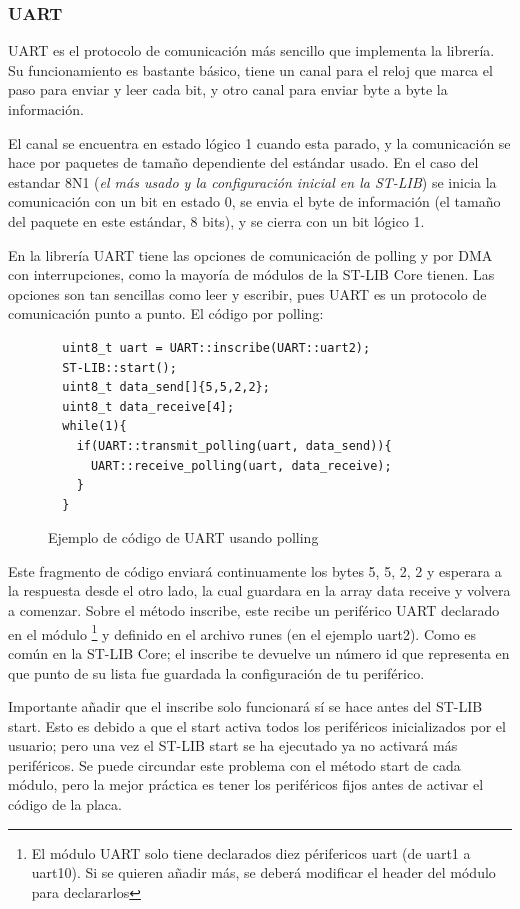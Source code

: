 \documentclass{report}
\begin{document}
\subsubsection{UART}
UART es el protocolo de comunicación más sencillo que implementa la librería. Su funcionamiento es bastante básico, tiene un canal para el reloj que marca el paso para enviar y leer cada bit, y otro canal para enviar byte a byte la información. 
\par
El canal se encuentra en estado lógico 1 cuando esta parado, y la comunicación se hace por paquetes de tamaño dependiente del estándar usado. En el caso del estandar 8N1 (\textit{el más usado y la configuración inicial en la ST-LIB}) se inicia la comunicación con un bit en estado 0, se envia el byte de información (el tamaño del paquete en este estándar, 8 bits), y se cierra con un bit lógico 1. 
\par \vspace{0.3cm}
En la librería UART tiene las opciones de comunicación de polling y por DMA con interrupciones, como la mayoría de módulos de la ST-LIB Core tienen. Las opciones son tan sencillas como leer y escribir, pues UART es un protocolo de comunicación punto a punto. El código por polling: 
\begin{figure}[h]
\begin{lstlisting}
  uint8_t uart = UART::inscribe(UART::uart2);
  ST-LIB::start();
  uint8_t data_send[]{5,5,2,2};
  uint8_t data_receive[4];
  while(1){
    if(UART::transmit_polling(uart, data_send)){
      UART::receive_polling(uart, data_receive);
    }
  }
\end{lstlisting}
\caption{Ejemplo de código de UART usando polling}
  \label{UARTwPollingcode}
\end{figure}
\par \vspace{0.3cm}
Este fragmento de código enviará continuamente los bytes 5, 5, 2, 2 y esperara a la respuesta desde el otro lado, la cual guardara en la array data receive y volvera a comenzar. Sobre el método inscribe, este recibe un periférico UART declarado en el módulo \footnote{El módulo UART solo tiene declarados diez périfericos uart (de uart1 a uart10). Si se quieren añadir más, se deberá modificar el header del módulo para declararlos} y definido en el archivo runes (en el ejemplo uart2). Como es común en la ST-LIB Core; el inscribe te devuelve un número id que representa en que punto de su lista fue guardada la configuración de tu periférico. 
\par
Importante añadir que el inscribe solo funcionará sí se hace antes del ST-LIB start. Esto es debido a que el start activa todos los periféricos inicializados por el usuario; pero una vez el ST-LIB start se ha ejecutado ya no activará más periféricos. Se puede circundar este problema con el método start de cada módulo, pero la mejor práctica es tener los periféricos fijos antes de activar el código de la placa. 
\end{document}
